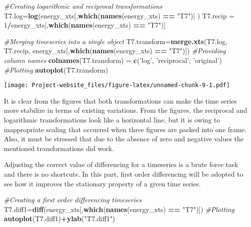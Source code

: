 \documentclass[]{article}
\newenvironment{Shaded}{\begin{snugshade}}{\end{snugshade}}
\newcommand{\KeywordTok}[1]{\textcolor[rgb]{0.13,0.29,0.53}{\textbf{#1}}}
\newcommand{\DecValTok}[1]{\textcolor[rgb]{0.00,0.00,0.81}{#1}}
\newcommand{\StringTok}[1]{\textcolor[rgb]{0.31,0.60,0.02}{#1}}
\newcommand{\CommentTok}[1]{\textcolor[rgb]{0.56,0.35,0.01}{\textit{#1}}}
\newcommand{\OperatorTok}[1]{\textcolor[rgb]{0.81,0.36,0.00}{\textbf{#1}}}
\newcommand{\NormalTok}[1]{#1}
\begin{document}
\begin{Shaded}
\begin{Highlighting}[]
\CommentTok{#Creating logarithmic and reciprocal transformations}
\NormalTok{T7.log=}\KeywordTok{log}\NormalTok{(energy_xts[,}\KeywordTok{which}\NormalTok{(}\KeywordTok{names}\NormalTok{(energy_xts) }\OperatorTok{==}\StringTok{ "T7"}\NormalTok{)] )}
\NormalTok{T7.recip =}\StringTok{ }\DecValTok{1}\OperatorTok{/}\NormalTok{energy_xts[,}\KeywordTok{which}\NormalTok{(}\KeywordTok{names}\NormalTok{(energy_xts) }\OperatorTok{==}\StringTok{ "T7"}\NormalTok{)]}

\CommentTok{#Merging timeseries into a single object}
\NormalTok{T7.transform=}\KeywordTok{merge.xts}\NormalTok{(T7.log, T7.recip, energy_xts[,}\KeywordTok{which}\NormalTok{(}\KeywordTok{names}\NormalTok{(energy_xts) }\OperatorTok{==}\StringTok{ "T7"}\NormalTok{)])}
\CommentTok{#Providing column names}
\KeywordTok{colnames}\NormalTok{(T7.transform) =}\StringTok{ }\KeywordTok{c}\NormalTok{(}\StringTok{'log'}\NormalTok{, }\StringTok{'reciprocal'}\NormalTok{, }\StringTok{'original'}\NormalTok{)}
\CommentTok{#Plotting}
\KeywordTok{autoplot}\NormalTok{(T7.transform)}
\end{Highlighting}
\end{Shaded}

\texttt{[image: Project-website\_files/figure-latex/unnamed-chunk-9-1.pdf]}

It is clear from the figures that both transformations can make the time
series more stabilize in terms of existing variations. From the figures,
the reciprocal and logarithmic transformations look like a horizontal
line, but it is owing to inappropriate scaling that occurred when three
figures are packed into one frame. Also, it must be stressed that due to
the absence of zero and negative values the mentioned transformations
did work.

Adjusting the correct value of differencing for a timeseries is a brute
force task and there is no shortcuts. In this part, first order
differencing will be adopted to see how it improves the stationary
property of a given time series.

\begin{Shaded}
\begin{Highlighting}[]
\CommentTok{#Creating a first order differencing timeseries}
\NormalTok{T7.diff1=}\KeywordTok{diff}\NormalTok{(energy_xts[,}\KeywordTok{which}\NormalTok{(}\KeywordTok{names}\NormalTok{(energy_xts) }\OperatorTok{==}\StringTok{ "T7"}\NormalTok{)])}
\CommentTok{#Plotting}
\KeywordTok{autoplot}\NormalTok{(T7.diff1)}\OperatorTok{+}\KeywordTok{ylab}\NormalTok{(}\StringTok{"T7.diff1"}\NormalTok{)}
\end{Highlighting}
\end{Shaded}
\end{document}
